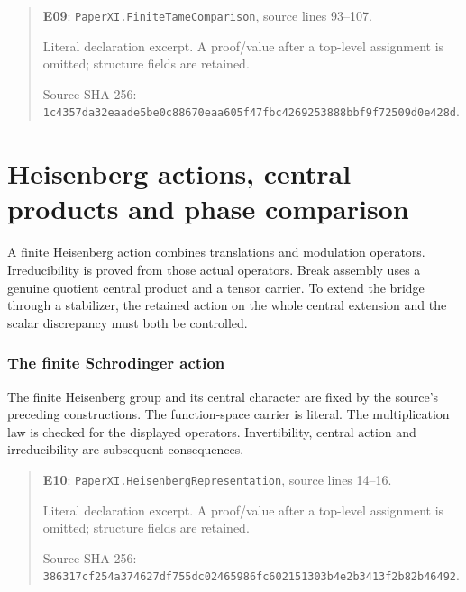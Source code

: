 \documentclass[10pt,oneside]{book}
\begin{document}
\begin{quote}\footnotesize\textbf{E09}: \nolinkurl{PaperXI.FiniteTameComparison}, source lines 93--107.\par Literal declaration excerpt. A proof/value after a top-level assignment is omitted; structure fields are retained.\par Source SHA-256: {\scriptsize\texttt{1c4357da32eaade5be0c88670eaa605f47fbc4269253888bbf9f72509d0e428d}}.\end{quote}


\chapter{Heisenberg actions, central products and phase comparison}
A finite Heisenberg action combines translations and modulation operators. Irreducibility is proved from those actual operators. Break assembly uses a genuine quotient central product and a tensor carrier. To extend the bridge through a stabilizer, the retained action on the whole central extension and the scalar discrepancy must both be controlled.

\subsection{The finite Schrodinger action}
\label{guide:E10}
The finite Heisenberg group and its central character are fixed by the source's preceding constructions. The function-space carrier is literal.
The multiplication law is checked for the displayed operators. Invertibility, central action and irreducibility are subsequent consequences.

\begin{quote}\footnotesize\textbf{E10}: \nolinkurl{PaperXI.HeisenbergRepresentation}, source lines 14--16.\par Literal declaration excerpt. A proof/value after a top-level assignment is omitted; structure fields are retained.\par Source SHA-256: {\scriptsize\texttt{386317cf254a374627df755dc02465986fc602151303b4e2b3413f2b82b46492}}.\end{quote}

\end{document}
